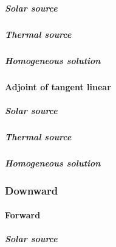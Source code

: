 \subparagraph{Solar source}
\label{sec:source_function_integration-local_source_greens_function-upward-tangent_linear-solar_source}

\subparagraph{Thermal source}
\label{sec:source_function_integration-local_source_greens_function-upward-tangent_linear-thermal_source}

\subparagraph{Homogeneous solution}
\label{sec:source_function_integration-local_source_greens_function-upward-tangent_linear-homogeneous_solution}


%
\paragraph{Adjoint of tangent linear}
\label{sec:source_function_integration-local_source_greens_function-upward-adjoint_of_tangent_linear}

\subparagraph{Solar source}
\label{sec:source_function_integration-local_source_greens_function-upward-adjoint_of_tangent_linear-solar_source}

\subparagraph{Thermal source}
\label{sec:source_function_integration-local_source_greens_function-upward-adjoint_of_tangent_linear-thermal_source}

\subparagraph{Homogeneous solution}
\label{sec:source_function_integration-local_source_greens_function-upward-adjoint_of_tangent_linear-homogeneous_solution}


%
\subsubsection{Downward}
\label{sec:source_function_integration-local_source_greens_function-downward}


%
\paragraph{Forward}
\label{sec:source_function_integration-local_source_greens_function-downward-forward}

\subparagraph{Solar source}
\label{sec:source_function_integration-local_source_greens_function-downward-forward-solar_source}

